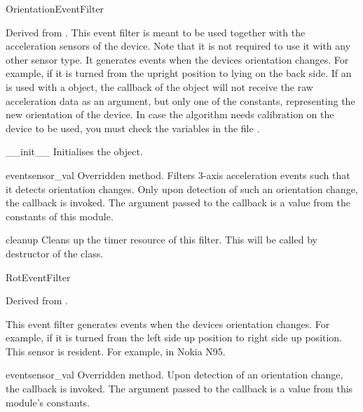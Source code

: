 \begin{classdesc*}{OrientationEventFilter}

Derived from .
This event filter is meant to be used together with the acceleration
sensors of the device. Note that it is not required to use it with any other sensor
type. It generates events when the devices orientation changes. For example, if it
is turned from the upright position to lying on the back side.
If an  is used with a  object,
the callback of the  object will not receive the raw acceleration data
as an argument, but only one of the  constants, representing
the new orientation of the device. In case the algorithm needs calibration on the
device to be used, you must check the  variables
in the file .

\begin{methoddesc}[OrientationEventFilter]{__init__}{}
Initialises the  object.
\end{methoddesc}

\begin{methoddesc}[OrientationEventFilter]{event}{sensor_val}
Overridden method. Filters 3-axis acceleration events such that
it detects orientation changes. Only upon detection of such an orientation
change, the callback is invoked. The argument passed to the callback is a
value from the  constants of this module.
\end{methoddesc}

\begin{methoddesc}[OrientationEventFilter]{cleanup}{}
Cleans up the timer resource of this filter. This will be called by destructor of the  class.
\end{methoddesc}
\end{classdesc*}

\begin{classdesc*}{RotEventFilter}

Derived from .

This event filter generates events when the devices orientation changes. For example, if 
it is turned from the left side up position to right side up position. This 
sensor is resident. For example, in Nokia N95.

\begin{methoddesc}[OrientationEventFilter]{event}{sensor_val}
Overridden method. Upon detection of an orientation change, the callback is 
invoked. The argument passed to the callback is a value from this module's 
 constants.
\end{methoddesc}
\end{classdesc*}
